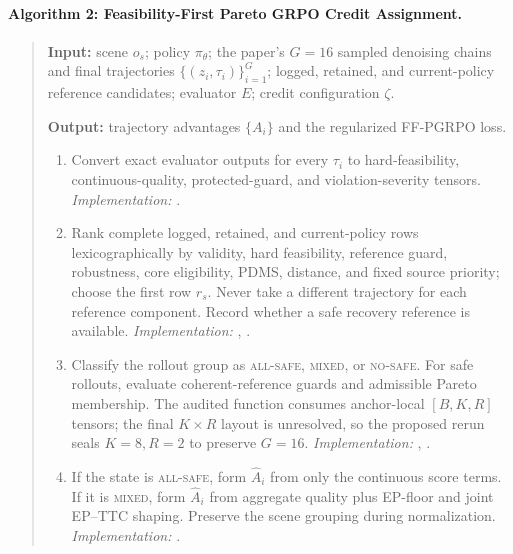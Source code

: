 \paragraph{Algorithm 2: Feasibility-First Pareto GRPO Credit Assignment.}
\label{alg:ffpgrpo}
\begin{quote}
\small
\textbf{Input:} scene $o_s$; policy $\pi_\theta$; the paper's $G=16$ sampled
denoising chains and final trajectories $\{(z_i,\tau_i)\}_{i=1}^{G}$; logged,
retained, and current-policy reference candidates; evaluator $E$; credit
configuration $\zeta$.

\textbf{Output:} trajectory advantages $\{A_i\}$ and the regularized
FF-PGRPO loss.

\begin{enumerate}
  \item Convert exact evaluator outputs for every $\tau_i$ to hard-feasibility,
  continuous-quality, protected-guard, and violation-severity tensors.
  \emph{Implementation:}
  .

  \item Rank complete logged, retained, and current-policy rows
  lexicographically by validity, hard feasibility, reference guard,
  robustness, core eligibility, PDMS, distance, and fixed source priority;
  choose the first row $r_s$.  Never take a different trajectory for each
  reference component.  Record whether a safe recovery reference is
  available.  \emph{Implementation:}
  ,
  .

  \item Classify the rollout group as \textsc{all-safe}, \textsc{mixed}, or
  \textsc{no-safe}.  For safe rollouts, evaluate coherent-reference guards and
  admissible Pareto membership.  The audited function consumes anchor-local
  $[B,K,R]$ tensors; the final $K\times R$ layout is unresolved, so the proposed
  rerun seals $K=8,R=2$ to preserve $G=16$.  \emph{Implementation:}
  ,
  .

  \item If the state is \textsc{all-safe}, form $\widehat A_i$ from only the
  continuous score terms.  If it is \textsc{mixed}, form $\widehat A_i$ from
  aggregate quality plus EP-floor and joint EP--TTC shaping.  Preserve the
  scene grouping during normalization.  \emph{Implementation:}
  .


\end{enumerate}
\end{quote}
